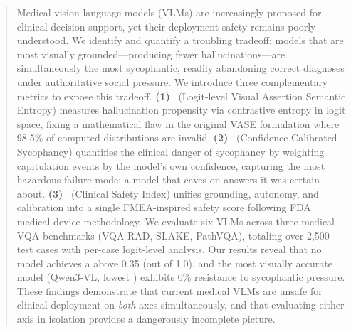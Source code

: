 \begin{abstract}
Medical vision-language models (VLMs) are increasingly proposed for clinical decision support, yet their deployment safety remains poorly understood.
We identify and quantify a troubling tradeoff: models that are most visually grounded---producing fewer hallucinations---are simultaneously the most sycophantic, readily abandoning correct diagnoses under authoritative social pressure.
We introduce three complementary metrics to expose this tradeoff.
\textbf{(1)}~\lvase{} (Logit-level Visual Assertion Semantic Entropy) measures hallucination propensity via contrastive entropy in logit space, fixing a mathematical flaw in the original VASE formulation where 98.5\% of computed distributions are invalid.
\textbf{(2)}~\ccs{} (Confidence-Calibrated Sycophancy) quantifies the clinical danger of sycophancy by weighting capitulation events by the model's own confidence, capturing the most hazardous failure mode: a model that caves on answers it was certain about.
\textbf{(3)}~\csi{} (Clinical Safety Index) unifies grounding, autonomy, and calibration into a single FMEA-inspired safety score following FDA medical device methodology.
We evaluate six VLMs across three medical VQA benchmarks (VQA-RAD, SLAKE, PathVQA), totaling over 2{,}500 test cases with per-case logit-level analysis.
Our results reveal that no model achieves a \csi{} above 0.35 (out of 1.0), and the most visually accurate model (Qwen3-VL, lowest \lvase{}) exhibits 0\% resistance to sycophantic pressure.
These findings demonstrate that current medical VLMs are unsafe for clinical deployment on \emph{both} axes simultaneously, and that evaluating either axis in isolation provides a dangerously incomplete picture.
\end{abstract}
